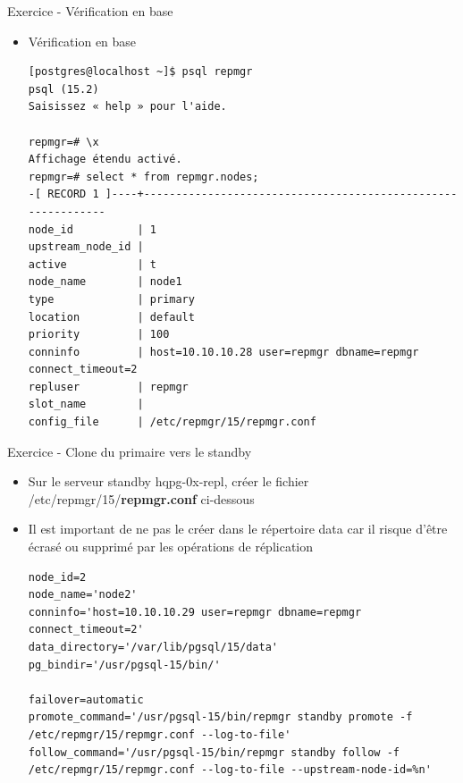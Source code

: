\begin{frame}[fragile]{Exercice - Vérification en base}

   \begin{itemize}
      \item Vérification en base
\begin{tiny}
\begin{Verbatim}[commandchars=\&\{\}]
[postgres@localhost ~]$ psql repmgr
psql (15.2)
Saisissez « help » pour l'aide.

repmgr=# \x
Affichage étendu activé.
repmgr=# select * from repmgr.nodes;
-[ RECORD 1 ]----+-------------------------------------------------------------
node_id          | 1
upstream_node_id | 
active           | t
node_name        | node1
type             | primary
location         | default
priority         | 100
conninfo         | host=10.10.10.28 user=repmgr dbname=repmgr connect_timeout=2
repluser         | repmgr
slot_name        | 
config_file      | /etc/repmgr/15/repmgr.conf
\end{Verbatim}
\end{tiny}
   \end{itemize}

\begin{toile}
\end{toile}

\end{frame}


\begin{frame}[fragile]{Exercice - Clone du primaire vers le standby}

   \begin{itemize}
      \item Sur le serveur standby hqpg-0x-repl, créer le fichier /etc/repmgr/15/\textbf{repmgr.conf} ci-dessous
      \item Il est important de ne pas le créer dans le répertoire data car il risque d'être écrasé ou supprimé par les opérations de réplication
\begin{tiny}
\begin{Verbatim}[commandchars=\\\{\}]
node_id=2
node_name='node2'
conninfo='host=10.10.10.29 user=repmgr dbname=repmgr connect_timeout=2'
data_directory='/var/lib/pgsql/15/data'
pg_bindir='/usr/pgsql-15/bin/'

failover=automatic
promote_command='/usr/pgsql-15/bin/repmgr standby promote -f /etc/repmgr/15/repmgr.conf --log-to-file'
follow_command='/usr/pgsql-15/bin/repmgr standby follow -f /etc/repmgr/15/repmgr.conf --log-to-file --upstream-node-id=%n'
\end{Verbatim}
\end{tiny}
   \end{itemize}

\begin{toile}
\end{toile}

\end{frame}

